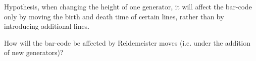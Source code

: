 \documentclass[General-Information/editedlog.tex]{subfiles}
\begin{document}
\begin{question}
Hypothesis, when changing the height of one generator, it will affect the bar-code only by moving the birth and death time of certain lines, rather than by introducing additional lines.
\end{question}

\begin{question}
How will the bar-code be affected by Reidemeister moves (i.e. under the addition of new generators)?
\end{question}
\end{document}

